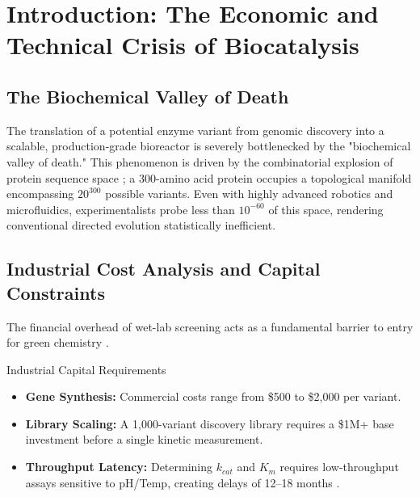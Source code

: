 \documentclass[11pt,a4paper,oneside]{article}
\begin{document}
\newpage
\tableofcontents
\newpage

\section{Introduction: The Economic and Technical Crisis of Biocatalysis}
\subsection{The Biochemical Valley of Death}
The translation of a potential enzyme variant from genomic discovery into a scalable, production-grade bioreactor is severely bottlenecked by the "biochemical valley of death." This phenomenon is driven by the combinatorial explosion of protein sequence space \cite{arnold2018directed}; a 300-amino acid protein occupies a topological manifold encompassing $20^{300}$ possible variants. Even with highly advanced robotics and microfluidics, experimentalists probe less than $10^{-60}$ of this space, rendering conventional directed evolution statistically inefficient.

\subsection{Industrial Cost Analysis and Capital Constraints}
The financial overhead of wet-lab screening acts as a fundamental barrier to entry for green chemistry \cite{bornscheuer2012biocatalysis}.
\begin{researchcard}{Industrial Capital Requirements}
    \begin{itemize}
        \item \textbf{Gene Synthesis:} Commercial costs range from \$500 to \$2,000 per variant.
        \item \textbf{Library Scaling:} A 1,000-variant discovery library requires a \$1M+ base investment before a single kinetic measurement.
        \item \textbf{Throughput Latency:} Determining $k_{cat}$ and $K_m$ requires low-throughput assays sensitive to pH/Temp, creating delays of 12--18 months \cite{brenda2021}.
    \end{itemize}
\end{researchcard}
\end{document}
